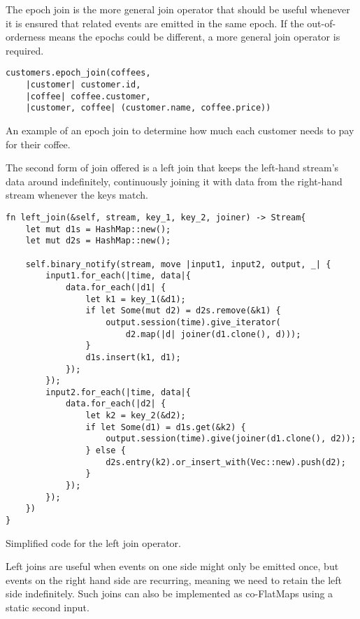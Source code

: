 The epoch join is the more general join operator that should be useful whenever it is ensured that related events are emitted in the same epoch. If the out-of-orderness means the epochs could be different, a more general join operator is required.

\begin{listing}[H]
\begin{verbatim}
customers.epoch_join(coffees,
    |customer| customer.id, 
    |coffee| coffee.customer, 
    |customer, coffee| (customer.name, coffee.price))
\end{verbatim}
\caption{An example of an epoch join to determine how much each customer needs to pay for their coffee.}
\label{lst:epoch-join-example}
\end{listing}

The second form of join offered is a left join that keeps the left-hand stream's data around indefinitely, continuously joining it with data from the right-hand stream whenever the keys match.

\begin{listing}[H]
\begin{verbatim}
fn left_join(&self, stream, key_1, key_2, joiner) -> Stream{
    let mut d1s = HashMap::new();
    let mut d2s = HashMap::new();

    self.binary_notify(stream, move |input1, input2, output, _| {
        input1.for_each(|time, data|{
            data.for_each(|d1| {
                let k1 = key_1(&d1);
                if let Some(mut d2) = d2s.remove(&k1) {
                    output.session(time).give_iterator(
                        d2.map(|d| joiner(d1.clone(), d)));
                }
                d1s.insert(k1, d1);
            });
        });
        input2.for_each(|time, data|{
            data.for_each(|d2| {
                let k2 = key_2(&d2);
                if let Some(d1) = d1s.get(&k2) {
                    output.session(time).give(joiner(d1.clone(), d2));
                } else {
                    d2s.entry(k2).or_insert_with(Vec::new).push(d2);
                }
            });
        });
    })
}
\end{verbatim}
  \caption{Simplified code for the left join operator.}
  \label{lst:left-join}
\end{listing}

Left joins are useful when events on one side might only be emitted once, but events on the right hand side are recurring, meaning we need to retain the left side indefinitely. Such joins can also be implemented as co-FlatMaps using a static second input.

